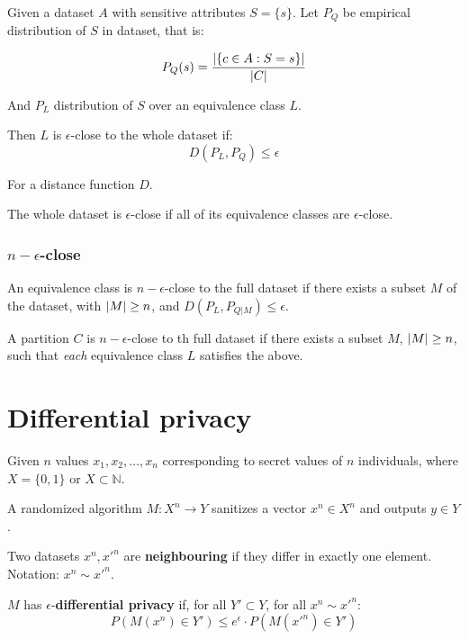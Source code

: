 \documentclass[a4paper]{scrreprt}
\DeclarePairedDelimiter\abs{\lvert}{\rvert}
\begin{document}
Given a dataset $A$ with sensitive attributes $S = \{s\}$. Let $P_Q$ be
empirical distribution of $S$ in dataset, that is:

\[
		P_Q(s) = \frac{\abs{\{c \in A : S = s\}}}{\abs{C}}
\]

And $P_L$ distribution of $S$ over an equivalence class $L$.

Then $L$ is $\epsilon$-close to the whole dataset if:
\[
		D(P_L, P_Q) \leq \epsilon
\]

For a distance function $D$.

The whole dataset is $\epsilon$-close if all of its equivalence classes are
$\epsilon$-close.

\subsection{$n-\epsilon$-close}

An equivalence class is $n-\epsilon$-close to the full dataset if there exists
a subset $M$ of the dataset, with $\abs{M} \geq n$, and $D(P_L, P_{Q | M}) \leq
\epsilon$.

A partition $C$ is $n-\epsilon$-close to th full dataset if there exists a
subset $M$, $\abs{M} \geq n$, such that \emph{each} equivalence class $L$
satisfies the above.

\chapter{Differential privacy}

Given $n$ values $x_1, x_2, \ldots, x_n$ corresponding to secret values of $n$
individuals, where $X = \{0, 1\}$ or $X \subset \mathbb{N}$.

A randomized algorithm $M : X^n \rightarrow Y$ sanitizes a vector $x^n \in X^n$
and outputs $y \in Y$.

Two datasets $x^n, x'^n$ are \textbf{neighbouring} if they differ in exactly
one element. Notation: $x^n \sim x'^n$.

$M$ has $\epsilon$-\textbf{differential privacy} if, for all $Y' \subset Y$, for all $x^n \sim x'^n$:
\[
		P(M(x^n) \in Y') \leq e^\epsilon \cdot P(M(x'^n) \in Y')
\]
\end{document}
